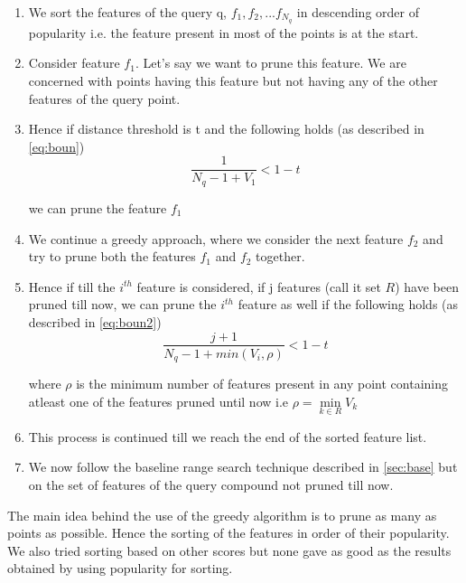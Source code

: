 \begin{enumerate}
	\item We sort the features of the query q, $f_1,f_2,...f_{N_q}$ in descending order of popularity i.e. the feature present in most of the points is at the start.
	
	\item Consider feature $f_1$. Let's say we want to prune this feature. We are concerned with points having this feature but not having any of the other features of the query point. 
	
	\item Hence if  distance threshold is t and the following holds (as described in \autoref{eq:boun}) 
	\begin{equation}
	\frac{1}{N_q - 1 + V_{1}}  < 1-t
	\end{equation}
	
we can prune the feature $f_1$		
	
	\item We continue a greedy approach, where we consider the next feature $f_2$ and try to prune both the features $f_1$ and $f_2$ together.
	
	\item Hence if till the $i^{th}$ feature is considered, if j features (call it set $R$) have been pruned till now, we can prune the $i^{th}$ feature as well if the following holds (as described in \autoref{eq:boun2})
	\begin{equation}
	\label{eq: greedy}
	\frac{j+1}{N_q - 1 + min(V_{i}, \rho)} < 1-t 
	\end{equation}
	
where 	$\rho$ is the minimum  number of features present in any point containing atleast one of the features pruned until now i.e $\rho = \min\limits_{k\in R} V_k$

	\item This process is continued till we reach the end of the sorted feature list.
	
	\item We now follow the baseline range search technique described in \autoref{sec:base} but on the set of features of the query compound not pruned till now. 
	
\end{enumerate}

The main idea behind the use of the greedy algorithm is to prune as many as points as possible. Hence the sorting of the features in order of their popularity. We also tried sorting based on other scores but none gave as good as the results obtained by using popularity for sorting. 

